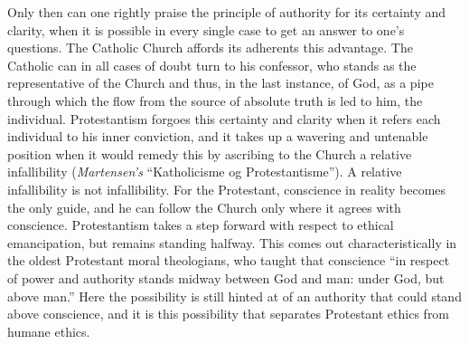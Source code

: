 \documentclass[12pt,a4paper,openany]{book}
\newcommand{\opage}[1]{\marginnote{\footnotesize\textit{[#1]}}}
\begin{document}
Only then can one rightly praise the principle of authority for its
certainty and clarity, when it is possible in every single case to get an
answer to one's questions. The Catholic Church affords its adherents this
advantage. The Catholic can in all cases of doubt turn to his confessor,
who stands as the representative of the Church and thus, in the last
instance, of God, as a pipe through which the flow from the source of
absolute truth is led to him, the individual. Protestantism forgoes this
certainty and clarity when it refers each individual to his inner
conviction, and it takes up a wavering and untenable position when it
would remedy this by ascribing to the Church a relative infallibility
(\emph{Martensen's} ``Katholicisme og Protestantisme''). A relative
infallibility is not infallibility. For the Protestant, conscience in
reality becomes the only guide, and he can follow the Church only where it
agrees with conscience. Protestantism takes a step forward with respect to
ethical emancipation, but remains standing halfway. This comes out
characteristically in the oldest Protestant moral theologians,
\opage{90}who taught that conscience ``in respect of power and authority
stands midway between God and man: under God, but above man.'' Here the
possibility is still hinted at of an authority that could stand above
conscience, and it is this possibility that separates Protestant ethics
from humane ethics.
\end{document}
